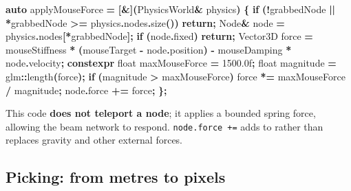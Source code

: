 \documentclass[
  10pt,
  a4paper,
]{article}
\newenvironment{Shaded}{\begin{snugshade}}{\end{snugshade}}
\newcommand{\BuiltInTok}[1]{#1}
\newcommand{\ControlFlowTok}[1]{\textcolor[rgb]{0.13,0.29,0.53}{\textbf{#1}}}
\newcommand{\DataTypeTok}[1]{\textcolor[rgb]{0.13,0.29,0.53}{#1}}
\newcommand{\FloatTok}[1]{\textcolor[rgb]{0.00,0.00,0.81}{#1}}
\newcommand{\KeywordTok}[1]{\textcolor[rgb]{0.13,0.29,0.53}{\textbf{#1}}}
\newcommand{\NormalTok}[1]{#1}
\newcommand{\OperatorTok}[1]{\textcolor[rgb]{0.81,0.36,0.00}{\textbf{#1}}}
\begin{document}
\begin{Shaded}
\begin{Highlighting}[]
\KeywordTok{auto}\NormalTok{ applyMouseForce }\OperatorTok{=} \OperatorTok{[\&](}\NormalTok{PhysicsWorld}\OperatorTok{\&}\NormalTok{ physics}\OperatorTok{)} \OperatorTok{\{}
    \ControlFlowTok{if} \OperatorTok{(!}\NormalTok{grabbedNode }\OperatorTok{||} \OperatorTok{*}\NormalTok{grabbedNode }\OperatorTok{\textgreater{}=}\NormalTok{ physics}\OperatorTok{.}\NormalTok{nodes}\OperatorTok{.}\NormalTok{size}\OperatorTok{())} \ControlFlowTok{return}\OperatorTok{;}
\NormalTok{    Node}\OperatorTok{\&}\NormalTok{ node }\OperatorTok{=}\NormalTok{ physics}\OperatorTok{.}\NormalTok{nodes}\OperatorTok{[*}\NormalTok{grabbedNode}\OperatorTok{];}
    \ControlFlowTok{if} \OperatorTok{(}\NormalTok{node}\OperatorTok{.}\NormalTok{fixed}\OperatorTok{)} \ControlFlowTok{return}\OperatorTok{;}
\NormalTok{    Vector3D force }\OperatorTok{=}\NormalTok{ mouseStiffness }\OperatorTok{*} \OperatorTok{(}\NormalTok{mouseTarget }\OperatorTok{{-}}\NormalTok{ node}\OperatorTok{.}\NormalTok{position}\OperatorTok{)}
                   \OperatorTok{{-}}\NormalTok{ mouseDamping }\OperatorTok{*}\NormalTok{ node}\OperatorTok{.}\NormalTok{velocity}\OperatorTok{;}
    \KeywordTok{constexpr} \DataTypeTok{float}\NormalTok{ maxMouseForce }\OperatorTok{=} \FloatTok{1500.0}\BuiltInTok{f}\OperatorTok{;}
    \DataTypeTok{float}\NormalTok{ magnitude }\OperatorTok{=}\NormalTok{ glm}\OperatorTok{::}\NormalTok{length}\OperatorTok{(}\NormalTok{force}\OperatorTok{);}
    \ControlFlowTok{if} \OperatorTok{(}\NormalTok{magnitude }\OperatorTok{\textgreater{}}\NormalTok{ maxMouseForce}\OperatorTok{)}
\NormalTok{        force }\OperatorTok{*=}\NormalTok{ maxMouseForce }\OperatorTok{/}\NormalTok{ magnitude}\OperatorTok{;}
\NormalTok{    node}\OperatorTok{.}\NormalTok{force }\OperatorTok{+=}\NormalTok{ force}\OperatorTok{;}
\OperatorTok{\};}
\end{Highlighting}
\end{Shaded}

This code \textbf{does not teleport a node}; it applies a bounded spring
force, allowing the beam network to respond. \texttt{node.force\ +=}
adds to rather than replaces gravity and other external forces.

\subsection{Picking: from metres to
pixels}\label{picking-from-metres-to-pixels}
\end{document}
